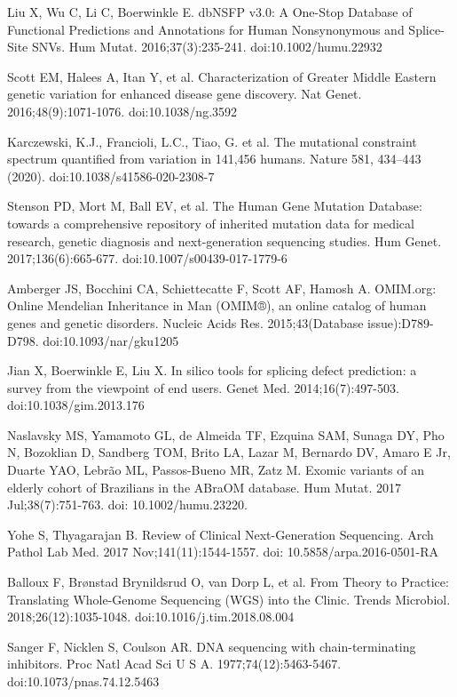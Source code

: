 \documentclass[a4paper,12pt]{article}
\begin{document}
\begin{thebibliography}{300}
Liu X, Wu C, Li C, Boerwinkle E. dbNSFP v3.0: A One-Stop Database of Functional Predictions and Annotations for Human Nonsynonymous and Splice-Site SNVs. Hum Mutat. 2016;37(3):235-241. doi:10.1002/humu.22932

Scott EM, Halees A, Itan Y, et al. Characterization of Greater Middle Eastern genetic variation for enhanced disease gene discovery. Nat Genet. 2016;48(9):1071-1076. doi:10.1038/ng.3592

Karczewski, K.J., Francioli, L.C., Tiao, G. et al. The mutational constraint spectrum quantified from variation in 141,456 humans. Nature 581, 434–443 (2020). doi:10.1038/s41586-020-2308-7

Stenson PD, Mort M, Ball EV, et al. The Human Gene Mutation Database: towards a comprehensive repository of inherited mutation data for medical research, genetic diagnosis and next-generation sequencing studies. Hum Genet. 2017;136(6):665-677. doi:10.1007/s00439-017-1779-6

Amberger JS, Bocchini CA, Schiettecatte F, Scott AF, Hamosh A. OMIM.org: Online Mendelian Inheritance in Man (OMIM®), an online catalog of human genes and genetic disorders. Nucleic Acids Res. 2015;43(Database issue):D789-D798. doi:10.1093/nar/gku1205

Jian X, Boerwinkle E, Liu X. In silico tools for splicing defect prediction: a survey from the viewpoint of end users. Genet Med. 2014;16(7):497-503. doi:10.1038/gim.2013.176

Naslavsky MS, Yamamoto GL, de Almeida TF, Ezquina SAM, Sunaga DY, Pho N, Bozoklian D, Sandberg TOM, Brito LA, Lazar M, Bernardo DV, Amaro E Jr, Duarte YAO, Lebrão ML, Passos-Bueno MR, Zatz M. Exomic variants of an elderly cohort of Brazilians in the ABraOM database. Hum Mutat. 2017 Jul;38(7):751-763. doi: 10.1002/humu.23220.


Yohe S, Thyagarajan B. Review of Clinical Next-Generation Sequencing. Arch Pathol Lab Med. 2017 Nov;141(11):1544-1557. doi: 10.5858/arpa.2016-0501-RA

Balloux F, Brønstad Brynildsrud O, van Dorp L, et al. From Theory to Practice: Translating Whole-Genome Sequencing (WGS) into the Clinic. Trends Microbiol. 2018;26(12):1035-1048. doi:10.1016/j.tim.2018.08.004

Sanger F, Nicklen S, Coulson AR. DNA sequencing with chain-terminating inhibitors. Proc Natl Acad Sci U S A. 1977;74(12):5463-5467. doi:10.1073/pnas.74.12.5463


\end{thebibliography}
\end{document}
